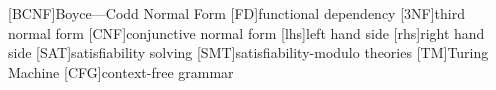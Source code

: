 \begin{acronym}[]
  [BCNF]{Boyce---Codd Normal Form}
  [FD]{functional dependency}
  [3NF]{third normal form}
  [CNF]{conjunctive normal form}
  [lhs]{left hand side}
  [rhs]{right hand side}
  [SAT]{satisfiability solving}
  [SMT]{satisfiability-modulo theories}
  [TM]{Turing Machine}
  [CFG]{context-free grammar}
\end{acronym}
